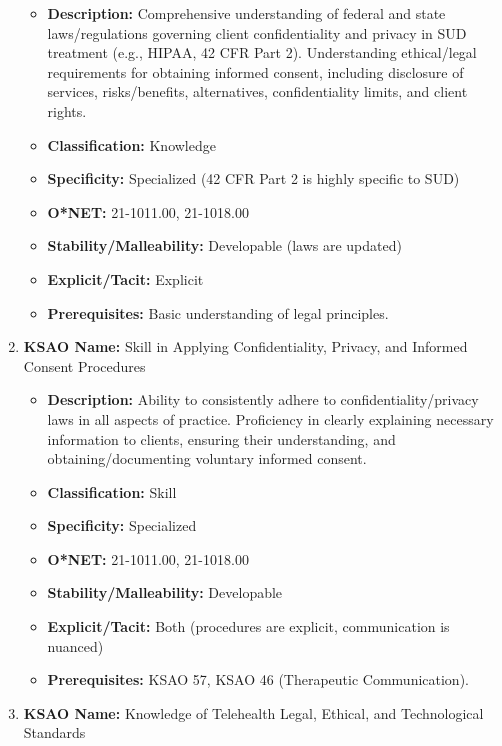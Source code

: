 \documentclass[
  letterpaper,
  DIV=11,
  numbers=noendperiod]{scrartcl}
\providecommand{\tightlist}{%
  \setlength{\itemsep}{0pt}\setlength{\parskip}{0pt}}
\begin{document}
\begin{enumerate}
  \begin{itemize}
  \tightlist
  \item
    \textbf{Description:} Comprehensive understanding of federal and
    state laws/regulations governing client confidentiality and privacy
    in SUD treatment (e.g., HIPAA, 42 CFR Part 2). Understanding
    ethical/legal requirements for obtaining informed consent, including
    disclosure of services, risks/benefits, alternatives,
    confidentiality limits, and client rights.
  \item
    \textbf{Classification:} Knowledge
  \item
    \textbf{Specificity:} Specialized (42 CFR Part 2 is highly specific
    to SUD)
  \item
    \textbf{O*NET:} 21-1011.00, 21-1018.00
  \item
    \textbf{Stability/Malleability:} Developable (laws are updated)
  \item
    \textbf{Explicit/Tacit:} Explicit
  \item
    \textbf{Prerequisites:} Basic understanding of legal principles.
  \end{itemize}
\item
  \textbf{KSAO Name:} Skill in Applying Confidentiality, Privacy, and
  Informed Consent Procedures

  \begin{itemize}
  \tightlist
  \item
    \textbf{Description:} Ability to consistently adhere to
    confidentiality/privacy laws in all aspects of practice. Proficiency
    in clearly explaining necessary information to clients, ensuring
    their understanding, and obtaining/documenting voluntary informed
    consent.
  \item
    \textbf{Classification:} Skill
  \item
    \textbf{Specificity:} Specialized
  \item
    \textbf{O*NET:} 21-1011.00, 21-1018.00
  \item
    \textbf{Stability/Malleability:} Developable
  \item
    \textbf{Explicit/Tacit:} Both (procedures are explicit,
    communication is nuanced)
  \item
    \textbf{Prerequisites:} KSAO 57, KSAO 46 (Therapeutic
    Communication).
  \end{itemize}
\item
  \textbf{KSAO Name:} Knowledge of Telehealth Legal, Ethical, and
  Technological Standards


\end{enumerate}
\end{document}
